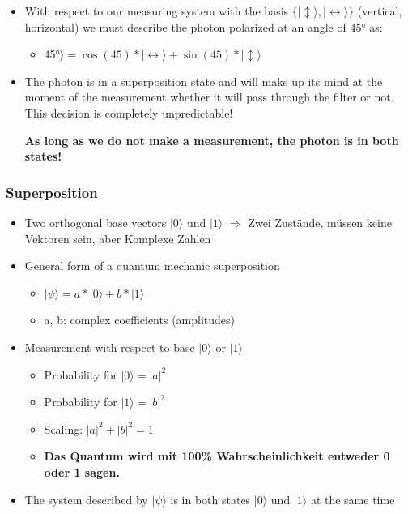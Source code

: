 \begin{itemize}
\item
  With respect to our measuring system with the basis $\{|{}\updownarrow  \rangle, |{}\leftrightarrow \rangle \}$ (vertical, horizontal) we must describe the photon polarized at an angle of 45° as:

  \begin{itemize}
  \tightlist
  \item
    \textbar{}45°$\rangle = \cos(45)*|{}\leftrightarrow\rangle + \sin(45)*|{}\updownarrow\rangle$
  \end{itemize}
\item
  The photon is in a superposition state and will make up its mind at
  the moment of the measurement whether it will pass through the filter
  or not. This decision is completely unpredictable!

  \textbf{As long as we do not make a measurement, the photon is in both
  states!}
\end{itemize}

\hypertarget{superposition}{%
\subsubsection{Superposition}\label{superposition}}

\begin{itemize}
\tightlist
\item
  Two orthogonal base vectors $|{}0\rangle$ und
  $|{}1\rangle$ $\Rightarrow$ Zwei Zustände, müssen keine Vektoren
  sein, aber Komplexe Zahlen
\item
  General form of a quantum mechanic superposition
  \begin{itemize}
  \tightlist
  \item
    $|{}\psi\rangle = a*|{}0\rangle + b*|{}1\rangle$
  \item
    a, b: complex coefficients (amplitudes)
  \end{itemize}
\item
  Measurement with respect to base $|{}0\rangle$ or $|{}1\rangle$

  \begin{itemize}
  \tightlist
  \item
    Probability for $|{}0\rangle = |a|^2$
  \item
    Probability for $|{}1\rangle = |b|^2$
  \item
    Scaling: $|a|^2 + |b|^2 = 1$
  \item
    \textbf{Das Quantum wird mit 100\% Wahrscheinlichkeit entweder 0 oder
    1 sagen.}
  \end{itemize}
\item
  The system described by $|{}\psi\rangle$ is in both states $|{}0\rangle$ und $|{}1\rangle$ at the same time
\end{itemize}

